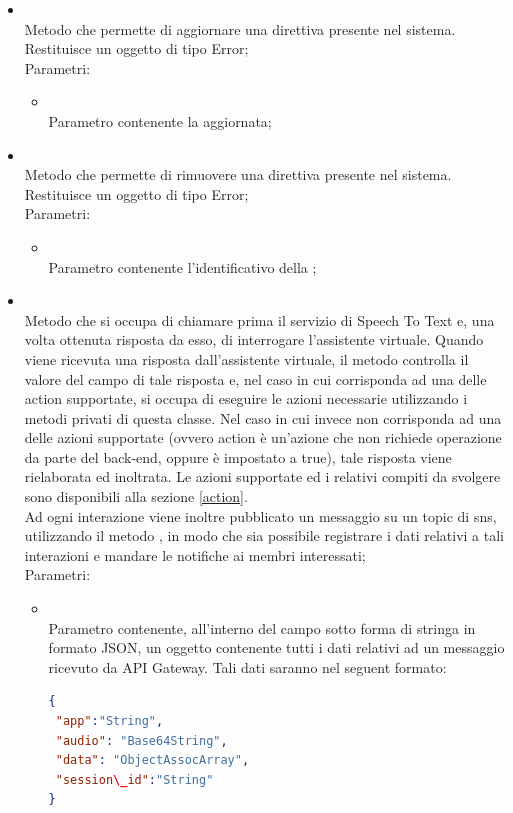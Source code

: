 \begin{itemize}
\begin{itemize}
;\\
		\item[]  \\
		Metodo che permette di aggiornare una direttiva presente nel sistema. Restituisce un oggetto di tipo Error;\\
		Parametri:
		\begin{itemize}
			\item {} \\
			Parametro contenente la  aggiornata;
		\end{itemize}
		\item[]  \\
		Metodo che permette di rimuovere una direttiva presente nel sistema. Restituisce un oggetto di tipo Error;\\
		Parametri:
		\begin{itemize}
			\item {} \\
			Parametro contenente l'identificativo della ;
		\end{itemize}
		\item[]  \\
		Metodo che si occupa di chiamare prima il servizio di Speech To Text e, una volta ottenuta risposta da esso, di interrogare l'assistente virtuale. Quando viene ricevuta una risposta dall'assistente virtuale, il metodo controlla il valore del campo  di tale risposta e, nel caso in cui corrisponda ad una delle action supportate, si occupa di eseguire le azioni necessarie utilizzando i metodi privati di questa classe. Nel caso in cui invece  non corrisponda ad una delle azioni supportate (ovvero action è un'azione che non richiede operazione da parte del back-end, oppure  è impostato a true), tale risposta viene rielaborata ed inoltrata. Le azioni supportate ed i relativi compiti da svolgere sono disponibili alla sezione \ref{action}. \\
Ad ogni interazione viene inoltre pubblicato un messaggio su un topic di sns, utilizzando il metodo , in modo che sia possibile registrare i dati relativi a tali interazioni e mandare le notifiche ai membri interessati;\\
		Parametri:
		\begin{itemize}
			\item {} \\
			Parametro contenente, all'interno del campo  sotto forma di stringa in formato JSON, un oggetto contenente tutti i dati relativi ad un messaggio ricevuto da API Gateway. Tali dati saranno nel seguent formato:
\begin{lstlisting}[language=json,firstnumber=1]
{
 "app":"String",
 "audio": "Base64String",
 "data": "ObjectAssocArray",
 "session\_id":"String"
}
\end{lstlisting}


\end{itemize}
\end{itemize}
\end{itemize}
